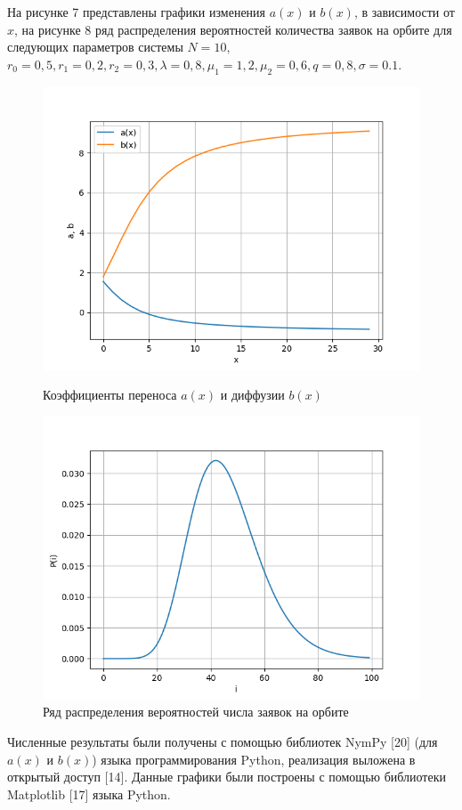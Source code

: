 На рисунке 7 представлены графики изменения $a(x)$ и $b(x)$, в зависимости от $x$, на рисунке 8 ряд распределения вероятностей количества заявок на орбите для следующих параметров системы $N=10$, $r_{0}=0,5, r_{1}=0,2, r_{2}=0,3, \lambda=0,8, \mu_{1}=1,2, \mu_{2}=0,6 , q=0,8, \sigma=0.1.$
\begin{figure}[H]
	\centering
	\begin{minipage}[h]{0.49\linewidth}
		\includegraphics[width=0.8\linewidth]{ab10} 	
		\caption{Коэффициенты переноса $a(x)$ и диффузии $b(x)$}
		\label{ris:experimoriginal}
	\end{minipage}
	\hfill
	\begin{minipage}[h]{0.49\linewidth}
		\includegraphics[width=0.8\linewidth]{P10} 
		\caption{Ряд распределения вероятностей числа заявок на орбите}
		\label{ris:experimcoded}
	\end{minipage}
\end{figure}

Численные результаты были получены с помощью библиотек NymPy [20] (для $a(x)$ и $b(x)$) языка программирования Python, реализация выложена в открытый доступ [14].
Данные графики были построены с помощью библиотеки Matplotlib [17] языка Python.

